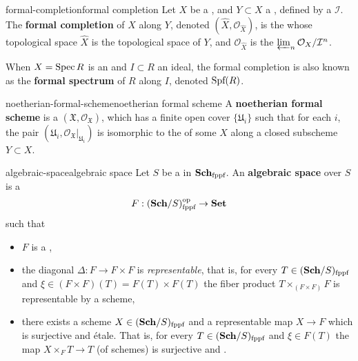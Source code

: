\begin{topic}{formal-completion}{formal completion}
    Let $X$ be a  , and $Y \subset X$ a , defined by a  $\mathcal{I}$. The \textbf{formal completion} of $X$ along $Y$, denoted $(\hat{X}, \mathcal{O}_{\hat{X}})$, is the  whose topological space $\hat{X}$ is the topological space of $Y$, and $\mathcal{O}_{\hat{X}}$ is the  $\varprojlim_n \mathcal{O}_X / \mathcal{I}^n$.
    
    When $X = \operatorname{Spec} R$ is an  and $I \subset R$ an ideal, the formal completion is also known as the \textbf{formal spectrum} of $R$ along $I$, denoted $\textup{Spf}(R)$.
\end{topic}

\begin{topic}{noetherian-formal-scheme}{noetherian formal scheme}
    A \textbf{noetherian formal scheme} is a  $(\mathfrak{X}, \mathcal{O}_\mathfrak{X})$, which has a finite open cover $\{ \mathfrak{U}_i \}$ such that for each $i$, the pair $(\mathfrak{U}_i, \mathcal{O}_\mathfrak{X}|_{\mathfrak{U}_i})$ is isomorphic to the  of some  $X$ along a closed subscheme $Y \subset X$.
\end{topic}

\begin{topic}{algebraic-space}{algebraic space}
    Let $S$ be a  in $\textbf{Sch}_\textup{fppf}$. An \textbf{algebraic space} over $S$ is a 
    \[ F : (\textbf{Sch}/S)_\textup{fppf}^\textup{op} \to \textbf{Set} \]
    such that
    \begin{itemize}
        \item $F$ is a ,
        \item the diagonal $\Delta : F \to F \times F$ is \textit{representable}, that is, for every $T \in (\textbf{Sch}/S)_\textup{fppf}$ and $\xi \in (F \times F)(T) = F(T) \times F(T)$ the fiber product $T \times_{(F \times F)} F$ is representable by a scheme,
        \item there exists a scheme $X \in (\textbf{Sch}/S)_\textup{fppf}$ and a representable map $X \to F$ which is surjective and étale. That is, for every $T \in (\textbf{Sch}/S)_\textup{fppf}$ and $\xi \in F(T)$ the map $X \times_F T \to T$ (of schemes) is surjective and .
    \end{itemize}
\end{topic}

